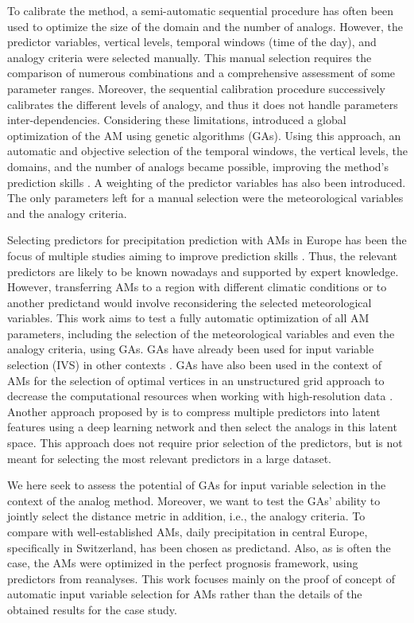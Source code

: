 \documentclass[draft]{agujournal2019}
\begin{document}
To calibrate the method, a semi-automatic sequential procedure \cite{Bontron2004, Radanovics2013, BenDaoud2016} has often been used to optimize the size of the domain and the number of analogs. However, the predictor variables, vertical levels, temporal windows (time of the day), and analogy criteria were selected manually. This manual selection requires the comparison of numerous combinations and a comprehensive assessment of some parameter ranges. Moreover, the sequential calibration procedure successively calibrates the different levels of analogy, and thus it does not handle parameters inter-dependencies. Considering these limitations,  introduced a global optimization of the AM using genetic algorithms (GAs). Using this approach, an automatic and objective selection of the temporal windows, the vertical levels, the domains, and the number of analogs became possible, improving the method's prediction skills \cite{Horton2018a}. A weighting of the predictor variables has also been introduced. The only parameters left for a manual selection were the meteorological variables and the analogy criteria.

Selecting predictors for precipitation prediction with AMs in Europe has been the focus of multiple studies aiming to improve prediction skills \cite{Obled2002, Bontron2004, Gibergans-Baguena2007, Radanovics2013, BenDaoud2016}. Thus, the relevant predictors are likely to be known nowadays and supported by expert knowledge. However, transferring AMs to a region with different climatic conditions or to another predictand would involve reconsidering the selected meteorological variables. This work aims to test a fully automatic optimization of all AM parameters, including the selection of the meteorological variables and even the analogy criteria, using GAs. GAs have already been used for input variable selection (IVS) in other contexts \cite{Dheygere2003, Huang2007, Cateni2010, Gobeyn2017}. GAs have also been used in the context of AMs for the selection of optimal vertices in an unstructured grid approach to decrease the computational resources when working with high-resolution data \cite{Hu2019}. Another approach proposed by  is to compress multiple predictors into latent features using a deep learning network and then select the analogs in this latent space. This approach does not require prior selection of the predictors, but is not meant for selecting the most relevant predictors in a large dataset.

We here seek to assess the potential of GAs for input variable selection in the context of the analog method. Moreover, we want to test the GAs' ability to jointly select the distance metric in addition, i.e., the analogy criteria. To compare with well-established AMs, daily precipitation in central Europe, specifically in Switzerland, has been chosen as predictand. Also, as is often the case, the AMs were optimized in the perfect prognosis framework, using predictors from reanalyses. This work focuses mainly on the proof of concept of automatic input variable selection for AMs rather than the details of the obtained results for the case study.
\end{document}

